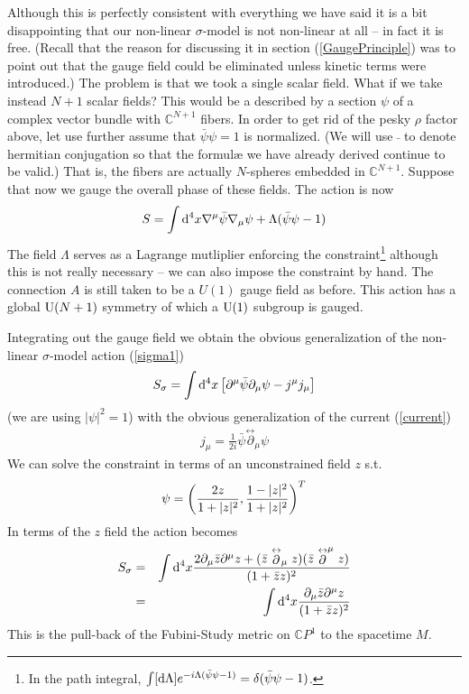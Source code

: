 \documentclass[12pt]{article}
\begin{document}
Although this is perfectly consistent with everything we have said it is a bit disappointing that our non-linear $\sigma$-model is not non-linear at all -- in fact it is free. (Recall that the reason for discussing it in section (\ref{GaugePrinciple}) was to point out that the gauge field could be eliminated unless kinetic terms were introduced.) The problem is that we took a single scalar field. What if we take instead $N+1$ scalar fields? 
This would be a described by a section $\psi$ of a complex vector bundle with ${\mathbb C}^{N+1}$ fibers. In order to get rid of the pesky $\rho$ factor above, let use further assume that $\bar \psi \psi=1$ is normalized. (We will use $\bar{}$ to denote hermitian conjugation so that the formul\ae{} we have already derived continue to be valid.) That is, the fibers are actually $N$-spheres embedded in ${\mathbb C}^{N+1}$.
Suppose that now we gauge the overall phase of these fields. The action is now
\begin{eqnarray}
S=\int {\rm d}^4 x \nabla^\mu \bar \psi \nabla_\mu \psi +\Lambda (\bar \psi \psi-1)
\end{eqnarray}
The field $\Lambda$ serves as a Lagrange mutliplier enforcing the constraint\footnote{In the path integral, $\int [{\rm d} \Lambda]{e^{-i \Lambda (\bar \psi\psi-1)}}=\delta(\bar \psi \psi-1)$.} although this is not really necessary -- we can also impose the constraint by hand. The connection $A$ is still taken to be a $U(1)$ gauge field as before. This action has a global ${\rm U}(N+1)$ symmetry of which a ${\rm U}(1)$ subgroup is gauged. 

Integrating out the gauge field we obtain the obvious generalization of the non-linear $\sigma$-model action (\ref{sigma1}) 
\begin{eqnarray}
S_\sigma= \int {\rm d}^4x \left[ \partial^\mu \bar \psi \partial_\mu \psi-j^\mu j_\mu \right]
\end{eqnarray}
(we are using $|\psi|^2=1$) with the obvious generalization of the current (\ref{current})
\begin{eqnarray}
j_\mu=\frac1{2i}\bar \psi \stackrel{\leftrightarrow}{\partial}_\mu \psi
\end{eqnarray}
We can solve the constraint in terms of an unconstrained field $z$ s.t.
\begin{eqnarray}
\psi=\left( { 2z \over 1+|z|^2}, {1-|z|^2\over 1+|z|^2}\right)^T
\end{eqnarray}
In terms of the $z$ field the action becomes 
\begin{eqnarray}
S_\sigma &=&\int {\rm d}^4x { 2\partial_\mu \bar z\partial^\mu z+ (\bar z \stackrel{\leftrightarrow}{\partial}_\mu z)(\bar z \stackrel{\leftrightarrow}{\partial}^\mu z)\over (1+\bar zz)^2}\cr
&=&\int {\rm d}^4x {\partial_\mu \bar z \partial^\mu z \over (1+\bar zz)^2}
\end{eqnarray}
This is the pull-back of the Fubini-Study metric on ${\mathbb C}P^1$ to the spacetime $M$.
\end{document}

